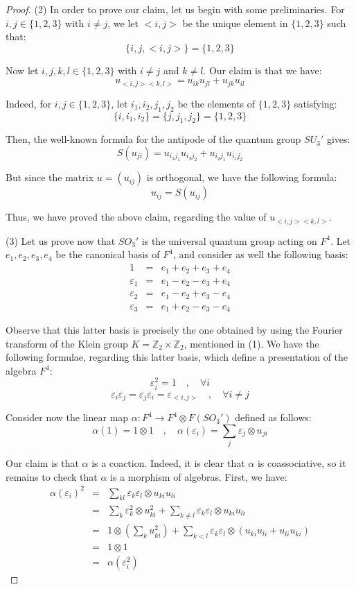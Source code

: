 \documentclass[10pt,a4paper]{amsart}
\begin{document}
\begin{proof}
\medskip

(2) In order to prove our claim, let us begin with some preliminaries. For $i,j\in\{1,2,3\}$
with $i\neq j$, we let $<i,j>$ be the unique  element in $\{1,2,3\}$ such that:
$$\{i,j,<i,j>\}=\{1,2,3\}$$

Now let $i,j,k,l \in \{1,2,3\}$ with $i\neq j$ and $k\neq l$. Our claim is that we have:
$$u_{<i,j><k,l>}=u_{ik}u_{jl}+u_{jk}u_{il}$$  

Indeed, for $i,j\in\{1,2,3\}$, let $i_1,i_2,j_1,j_2$ be the elements of $\{1,2,3\}$ satisfying:
$$\{i,i_1,i_2\}=\{j,j_1,j_2\}=\{1,2,3\} $$

Then, the well-known formula for the antipode of the quantum group $SU_3'$ gives:
$$S(u_{ji})=u_{i_1j_1}u_{i_2j_2}+u_{i_2j_1}u_{i_1j_2}$$

But since the matrix $u=(u_{ij})$ is orthogonal, we have the following formula:
$$u_{ij}=S(u_{ij})$$

Thus, we have proved the above claim, regarding the value of $u_{<i,j><k,l>}$.  

\medskip

(3) Let us prove now that $SO_3'$ is the universal quantum group acting on $F^4$. Let $e_1, e_2, e_3, e_4$ be the canonical basis of $F^4$, and consider as well the following basis:
\begin{eqnarray*}
1&=&e_1+e_2+e_3+e_4\\
\varepsilon_1&=&e_1-e_2-e_3+e_4\\
\varepsilon_2&=&e_1-e_2+e_3-e_4\\
\varepsilon_3&=&e_1+e_2-e_3-e_4
\end{eqnarray*}

Observe that this latter basis is precisely the one obtained by using the Fourier transform of the Klein group $K=\mathbb Z_2 \times\mathbb Z_2$, mentioned in (1). We have the following formulae, regarding this latter basis, which define a presentation of the algebra $F^4$:
$$\varepsilon_i^2=1\quad,\quad\forall i$$
$$\varepsilon_i\varepsilon_j=\varepsilon_j \varepsilon_i=\varepsilon_{<i, j>}\quad,\quad \forall i \neq j$$

Consider now the linear map $\alpha :F^4 \to F^4 \otimes F(SO_3')$ defined as follows:
$$\alpha(1)=1\otimes 1\quad,\quad \alpha(\varepsilon_i)=\sum_j\varepsilon_j\otimes u_{ji}$$

Our claim is that $\alpha$ is a coaction. Indeed, it is clear that $\alpha$ is coassociative, so it remains to check that $\alpha$ is a morphism of algebras. First, we have:
\begin{eqnarray*}
\alpha(\varepsilon_i)^2
&=&\sum_{kl}\varepsilon_k\varepsilon_l\otimes u_{ki}u_{li}\\
&=&\sum_k\varepsilon_k^2\otimes u_{ki}^2+\sum_{k\neq l}\varepsilon_k\varepsilon_l\otimes u_{ki}u_{li}\\
&=&1\otimes\left(\sum_ku_{ki}^2\right)+\sum_{k<l}\varepsilon_k\varepsilon_l\otimes(u_{ki}u_{li} +u_{li}u_{ki})\\
&=&1\otimes 1\\
&=&\alpha(\varepsilon_i^2)
\end{eqnarray*}


\end{proof}
\end{document}
